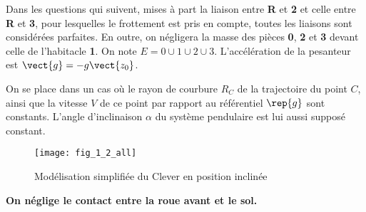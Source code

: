 Dans les questions qui suivent, mises à part la liaison entre \textbf{R} et \textbf{2} et celle entre \textbf{R} et \textbf{3}, pour lesquelles le frottement est pris en compte, toutes les liaisons sont considérées parfaites. En outre, on négligera la masse des pièces \textbf{0}, \textbf{2} et \textbf{3} devant celle de l'habitacle \textbf{1}. On note $E=0\cup 1 \cup 2 \cup 3$. L'accélération de la pesanteur est  $\vect{g}=-g\vect{z_0}$.

On se place dans un cas où le rayon de courbure $R_C$ de la trajectoire du point $C$, ainsi que la vitesse $V$ de ce point par rapport au référentiel $\rep{g}$ sont constants. L'angle d'inclinaison $\alpha$  du système pendulaire est lui aussi supposé constant.



\ifprof
\begin{corrige}
\end{corrige}
\else
\fi


\ifprof
\begin{corrige}
\end{corrige}
\else
\fi



\begin{figure}[H]
\centering
\texttt{[image: fig\_1\_2\_all]}

\caption{Modélisation simplifiée du Clever en position inclinée}
\label{fig_1_2}
\end{figure}
 
 \textbf{On néglige le contact entre la roue avant et le sol.}
 
\ifprof
\begin{corrige}
\end{corrige}
\else
\fi

\ifprof
\begin{corrige}
\end{corrige}
\else
\fi

